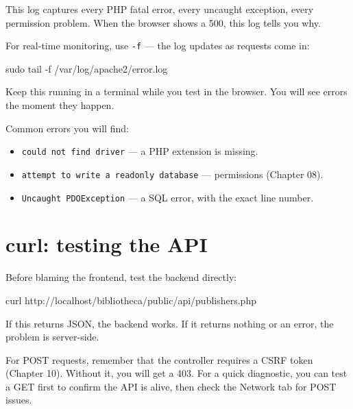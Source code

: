\documentclass[11pt,a4paper,oneside]{book}
\newenvironment{Shaded}{\begin{snugshade}}{\end{snugshade}}
\newcommand{\FunctionTok}[1]{\textcolor[HTML]{06287E}{#1}}
\newcommand{\ExtensionTok}[1]{#1}
\newcommand{\AttributeTok}[1]{\textcolor[HTML]{7D9029}{#1}}
\newcommand{\NormalTok}[1]{#1}
\providecommand{\tightlist}{%
  \setlength{\itemsep}{0pt}\setlength{\parskip}{0pt}}
\begin{document}
This log captures every PHP fatal error, every uncaught
exception, every permission problem. When the browser shows a
500, this log tells you why.

For real-time monitoring, use \texttt{-f} --- the log updates as
requests come in:

\begin{Shaded}
\begin{Highlighting}[]
\FunctionTok{sudo}\NormalTok{ tail }\AttributeTok{{-}f}\NormalTok{ /var/log/apache2/error.log}
\end{Highlighting}
\end{Shaded}

Keep this running in a terminal while you test in the browser.
You will see errors the moment they happen.

Common errors you will find:

\begin{itemize}
\tightlist
\item
  \texttt{could\ not\ find\ driver} --- a PHP extension is
  missing.
\item
  \texttt{attempt\ to\ write\ a\ readonly\ database} ---
  permissions (Chapter 08).
\item
  \texttt{Uncaught\ PDOException} --- a SQL error, with the exact
  line number.
\end{itemize}

\hypertarget{curl-testing-the-api}{%
\section{curl: testing the API}\label{curl-testing-the-api}}

Before blaming the frontend, test the backend directly:

\begin{Shaded}
\begin{Highlighting}[]
\ExtensionTok{curl}\NormalTok{ http://localhost/bibliotheca/public/api/publishers.php}
\end{Highlighting}
\end{Shaded}

If this returns JSON, the backend works. If it returns nothing or
an error, the problem is server-side.

For POST requests, remember that the controller requires a CSRF
token (Chapter 10). Without it, you will get a 403. For a quick
diagnostic, you can test a GET first to confirm the API is alive,
then check the Network tab for POST issues.
\end{document}
